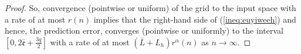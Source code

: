 \documentclass{article} %
\theoremstyle{definition}
\theoremstyle{remark}
\newtheorem{remark}[thm]{Remark}
\newcommand{\nat}{\mathbb N}
\newcommand{\inspace}{\ensuremath{ \mathcal X}}
\newcommand{\outspace}{\ensuremath{ \mathcal Y}}
\newcommand{\metric}{\, \mathfrak{d}} %
\newcommand{\predfn}{\, \mathfrak{  \hat f_n}} %
\newcommand{\hexp}{{ \alpha }}%
\newcommand{\hestthresh}{\ensuremath{ \lambda}}
\newcommand{\obserrbnd}{\bar{\mathfrak e}}
\newcommand{\seq}[2]{\ensuremath{\bigl(#1\bigr)_{#2}}}
\begin{document}
\begin{proof}
So, convergence (pointwise or uniform) of the grid to the input space with a rate of at most $r(n)$ implies that the right-hand side of (\ref{ineq:euyiweeh}) and hence, the prediction error,  
converges (pointwise or uniformly) to the interval $[0,2 \obserrbnd + \frac {3q}{2}] $ with a rate of at most $(\bar L + L_h) r^\hexp(n)$ as $n \to  \infty$.



%
%
%
%
%
%

\end{proof}

\end{document}
